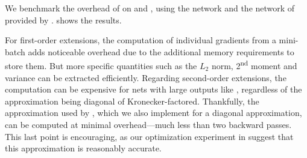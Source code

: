 We benchmark the overhead of \BackPACK %
on \CIFARTEN and \CIFARHUN, using the \CIFARTENNET network and the \ALLCNNC
network of \citet{springenberg2015striving} provided by \DeepOBS
\citep{schneider2019deepobs}.
 shows the results.

For first-order extensions, the computation of individual gradients from a
mini-batch adds noticeable overhead due to the additional memory requirements to
store them. But more specific quantities such as the $L_2$ norm,
2\textsuperscript{nd} moment and variance can be extracted efficiently.
Regarding second-order extensions, the \ggn computation can be expensive for
nets with large outputs like , regardless of the approximation being
diagonal of Kronecker-factored. Thankfully, the \MC approximation used by \KFAC,
which we also implement for a diagonal approximation, can be computed at minimal
overhead---much less than two backward passes. This last point is encouraging,
as our optimization experiment in  suggest that
this approximation is reasonably accurate.

